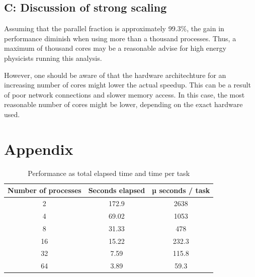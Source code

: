 \documentclass{article}
\begin{document}
\subsection*{C: Discussion of strong scaling}


Assuming that the parallel fraction is approximately 99.3\%, the gain in performance diminish when using more than a thousand processes. Thus, a maximum of thousand cores may be a reasonable advise for high energy physicists running this analysis.

However, one should be aware of that the hardware architechture for an increasing number of cores might lower the actual speedup. This can be a result of poor network connections and slower memory access. In this case, the most reasonable number of cores might be lower, depending on the exact hardware used.



\newpage

\section{Appendix}

\begin{table}[h!]
    \centering
    \caption{Performance as total elapsed time and time per task}
    \begin{tabular}{|c c c|} 
    \hline
    Number of processes & Seconds elapsed & µ seconds / task \\ \hline
    2 & 172.9 & 2638  \\ \hline
    4 & 69.02 & 1053  \\ \hline
    8 & 31.33 & 478  \\ \hline
    16 & 15.22 & 232.3 \\ \hline
    32 & 7.59 & 115.8 \\ \hline 
    64 & 3.89 & 59.3 \\ \hline
    \end{tabular}
    \label{tab:raw_perf}
\end{table}


\end{document}
